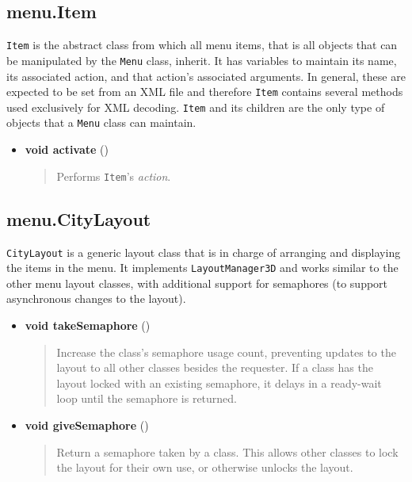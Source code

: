 \documentclass[letterpaper, titlepage, 11pt]{article}
\begin{document}
\subsection{menu.Item}
\texttt{Item} is the abstract class from which all menu items, that is all
objects that can be manipulated by the \texttt{Menu} class, inherit.  It has
variables to maintain its name, its associated action, and that action's
associated arguments. In general, these are expected to be set from an XML file
and therefore \texttt{Item} contains several methods used exclusively for
XML decoding.  \texttt{Item} and its children are the only type of objects
that a \texttt{Menu} class can maintain.

\begin{itemize}
\item[] \textbf{void activate} ()
\begin{quotation}
Performs \texttt{Item}'s \textit{action}.
\end{quotation}
\end{itemize}

\subsection{menu.CityLayout}
\texttt{CityLayout} is a generic layout class that is in charge of arranging and
displaying the items in the menu.  It implements \texttt{LayoutManager3D} and
works similar to the other menu layout classes, with additional support for
semaphores (to support asynchronous changes to the layout).

\begin{itemize}
\item[] \textbf{void takeSemaphore} ()
\begin{quotation}
Increase the class's semaphore usage count, preventing updates to the layout
to all other classes besides the requester.  If a class has the layout locked
with an existing semaphore, it delays in a ready-wait loop until the semaphore
is returned.
\end{quotation}

\item[] \textbf{void giveSemaphore} ()
\begin{quotation}
Return a semaphore taken by a class.  This allows other classes to lock the
layout for their own use, or otherwise unlocks the layout.
\end{quotation}
\end{itemize}
\end{document}
